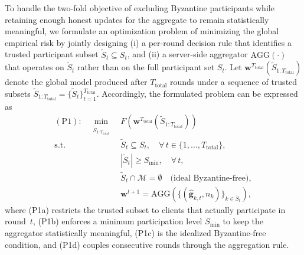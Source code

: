 \documentclass[journal]{IEEEtran}
\begin{document}
To handle the two-fold objective of excluding Byzantine participants while retaining enough honest updates for the aggregate to remain statistically meaningful, we formulate an optimization problem of minimizing the global empirical risk by jointly designing (i) a per-round decision rule that identifies a trusted participant subset $\widetilde{S}_t \subseteq S_t$, and (ii) a server-side aggregator $\text{AGG}(\cdot)$ that operates on $\widetilde{S}_t$ rather than on the full participant set $S_t$. Let $\mathbf{w}^{T_{\text{total}}}(\widetilde{S}_{1:T_{\text{total}}})$ denote the global model produced after $T_{\text{total}}$ rounds under a sequence of trusted subsets $\widetilde{S}_{1:T_{\text{total}}}=\{\widetilde{S}_t\}_{t=1}^{T_{\text{total}}}$. Accordingly, the formulated problem can be expressed as
\begin{subequations}\label{eq:p1}
\begin{align}
(\mathrm{P1}):\quad\min_{\widetilde{S}_{1:T_{\text{total}}}}\;& F\!\left(\mathbf{w}^{T_{\text{total}}}(\widetilde{S}_{1:T_{\text{total}}})\right) \label{eq:p1_obj}\\
\text{s.t.}\quad &\widetilde{S}_t \subseteq S_t,\quad \forall\,t\in\{1,\dots,T_{\text{total}}\}, \tag{P1a}\\
&|\widetilde{S}_t| \ge S_{\min},\quad \forall\,t, \tag{P1b}\\
&\widetilde{S}_t \cap \mathcal{M} = \emptyset \quad \text{(ideal Byzantine-free)}, \tag{P1c}\\
&\mathbf{w}^{t+1}=\text{AGG}\!\left(\{(\hat{\mathbf{g}}_{k,t},n_k)\}_{k\in\widetilde{S}_t}\right),\tag{P1d}
\end{align}
\end{subequations}
where (P1a) restricts the trusted subset to clients that actually participate in round~$t$, (P1b) enforces a minimum participation level $S_{\min}$ to keep the aggregator statistically meaningful, (P1c) is the idealized Byzantine-free condition, and (P1d) couples consecutive rounds through the aggregation rule.
\end{document}
